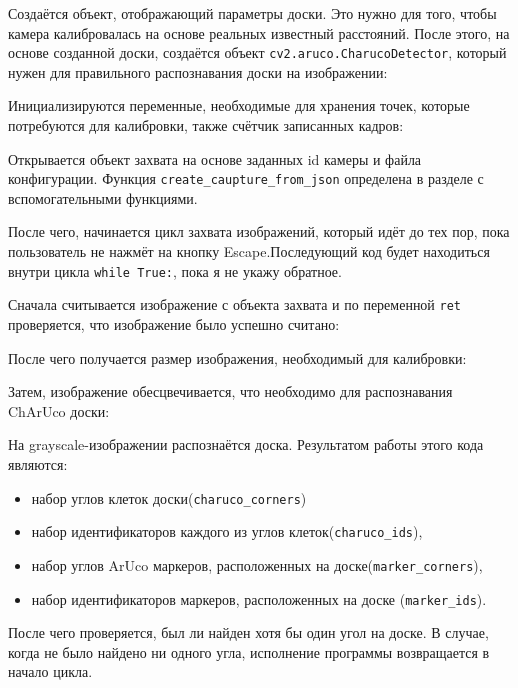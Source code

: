 \documentclass[14pt, a4paper]{extarticle}
\begin{document}
Создаётся объект, отображающий параметры доски. Это нужно для того, чтобы
камера калибровалась на основе реальных известный расстояний. После этого, на основе
созданной доски, создаётся объект \texttt{cv2.aruco.CharucoDetector}, который
нужен для правильного распознавания доски на изображении:

Инициализируются переменные, необходимые для хранения точек, которые потребуются
для калибровки, также счётчик записанных кадров:

Открывается объект захвата на основе заданных id камеры и файла конфигурации.
Функция \texttt{create\_caupture\_from\_json} определена в разделе с
вспомогательными функциями.

После чего, начинается цикл захвата изображений, который идёт до тех пор, пока
пользователь не нажмёт на кнопку Escape.Последующий код будет
находиться внутри цикла \texttt{while True:}, пока я не укажу обратное.
\par
Сначала считывается изображение с объекта захвата и по переменной
\texttt{ret} проверяется, что изображение было успешно считано:

После чего получается размер изображения, необходимый для калибровки:

Затем, изображение обесцвечивается, что необходимо для распознавания ChArUco доски:

На grayscale-изображении распознаётся доска. Результатом работы этого кода
являются: 
\begin{itemize}
  \item набор углов клеток доски(\texttt{charuco\_corners})
  \item набор идентификаторов каждого из углов клеток(\texttt{charuco\_ids}),
  \item набор углов ArUco маркеров, расположенных на доске(\texttt{marker\_corners}),
  \item набор идентификаторов маркеров, расположенных на доске (\texttt{marker\_ids}).
\end{itemize}
После чего проверяется, был ли найден хотя бы один угол на доске.
В случае, когда не было найдено ни одного угла, исполнение программы
возвращается в начало цикла.
\end{document}
